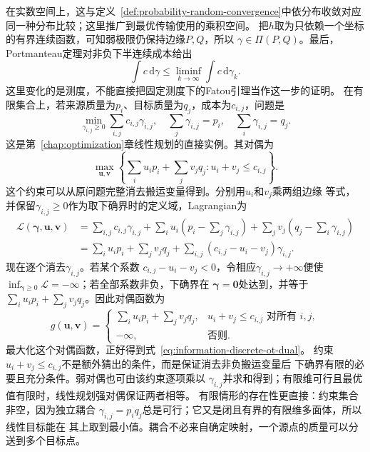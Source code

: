 在实数空间上，这与定义~\ref{def:probability-random-convergence}中依分布收敛对应同一种分布比较；这里推广到最优传输使用的乘积空间。
把\(h\)取为只依赖一个坐标的有界连续函数，可知弱极限仍保持边缘\(P,Q\)，所以
\(\gamma\in\Pi(P,Q)\)。最后，Portmanteau定理对非负下半连续成本给出
\[
  \int c\,\mathrm{d}\gamma
  \leq
  \liminf_{k\to\infty}\int c\,\mathrm{d}\gamma_k.
\]
这里变化的是测度，不能直接把固定测度下的Fatou引理当作这一步的证明。
在有限集合上，若来源质量为\(p_i\)、目标质量为\(q_j\)，成本为\(c_{i,j}\)，问题是
\[
  \min_{\gamma_{i,j}\geq0}
  \sum_{i,j}c_{i,j}\gamma_{i,j},
  \quad
  \sum_j\gamma_{i,j}=p_i,\quad
  \sum_i\gamma_{i,j}=q_j.
\]
这是第~\ref{chap:optimization}章线性规划的直接实例。其对偶为
\begin{equation}
  \max_{\bm{u},\bm{v}}
  \left\{
    \sum_i u_ip_i+\sum_jv_jq_j:
    u_i+v_j\leq c_{i,j}
  \right\}.
  \label{eq:information-discrete-ot-dual}
\end{equation}
这个约束可以从原问题完整消去搬运变量得到。分别用\(u_i\)和\(v_j\)乘两组边缘
等式，并保留\(\gamma_{i,j}\geq0\)作为取下确界时的定义域，Lagrangian为
\begin{align}
  \mathcal{L}(\bm{\gamma},\bm{u},\bm{v})
  &=
  \sum_{i,j}c_{i,j}\gamma_{i,j}
  +\sum_i u_i\left(p_i-\sum_j\gamma_{i,j}\right)
  +\sum_j v_j\left(q_j-\sum_i\gamma_{i,j}\right)
  \nonumber\\
  &=
  \sum_i u_ip_i+\sum_jv_jq_j
  +\sum_{i,j}(c_{i,j}-u_i-v_j)\gamma_{i,j}.
  \label{eq:information-discrete-ot-lagrangian}
\end{align}
现在逐个消去\(\gamma_{i,j}\)。若某个系数
\(c_{i,j}-u_i-v_j<0\)，令相应\(\gamma_{i,j}\to+\infty\)便使
\(\inf_{\bm{\gamma}\geq0}\mathcal{L}=-\infty\)；若全部系数非负，下确界在
\(\bm{\gamma}=\bm0\)处达到，并等于
\(\sum_i u_ip_i+\sum_jv_jq_j\)。因此对偶函数为
\[
  g(\bm{u},\bm{v})
  =
  \begin{cases}
    \sum_i u_ip_i+\sum_jv_jq_j,
      &u_i+v_j\leq c_{i,j}\text{ 对所有 }i,j,\\
    -\infty,&\text{否则}.
  \end{cases}
\]
最大化这个对偶函数，正好得到式~\eqref{eq:information-discrete-ot-dual}。
约束\(u_i+v_j\leq c_{i,j}\)不是额外猜出的条件，而是保证消去非负搬运变量后
下确界有限的必要且充分条件。弱对偶也可由该约束逐项乘以
\(\gamma_{i,j}\)并求和得到；有限维可行且最优值有限时，线性规划强对偶保证两者相等。
有限情形的存在性更直接：约束集合非空，因为独立耦合
\(\gamma_{i,j}=p_iq_j\)总是可行；它又是闭且有界的有限维多面体，所以线性目标能在
其上取到最小值。耦合不必来自确定映射，一个源点的质量可以分送到多个目标点。

